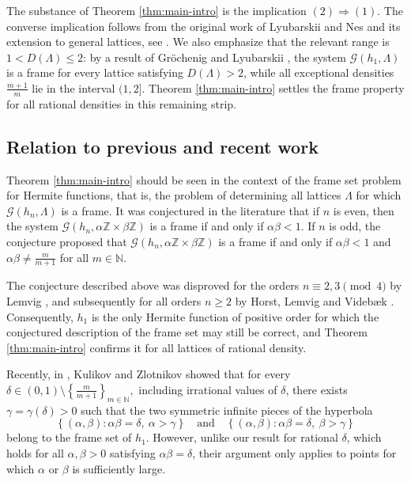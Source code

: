 \documentclass[reqno,a4paper,12pt]{amsart}
\numberwithin{equation}{section}
\newcommand{\N}{\mathbb N}
\newcommand{\Z}{\mathbb Z}
\newcommand{\calG}{\mathcal G}
\begin{document}
The substance of Theorem \ref{thm:main-intro} is the implication $(2)\Rightarrow(1)$. The converse implication follows from the original work of Lyubarskii and Nes and its extension to general lattices, see \cite{Faulhuber2020}.
We also emphasize that the relevant range is $1 < D(\Lambda) \leq 2$: by a result of Gr\"ochenig and Lyubarskii \cite{GroechenigLyubarskii2007,GroechenigLyubarskii2009}, the system $\calG(h_1,\Lambda)$ is a frame for every lattice satisfying $D(\Lambda) > 2$, while all exceptional densities $\frac{m+1}{m}$ lie in the interval $(1,2]$. Theorem \ref{thm:main-intro} settles the frame property for all rational densities in this remaining strip.

\subsection{Relation to previous and recent work}\label{sec:prev_rec_work}
Theorem \ref{thm:main-intro} should be seen in the context of the frame set problem for Hermite functions, that is, the problem of determining all lattices $\Lambda$ for which $\calG(h_n,\Lambda)$ is a frame. It was conjectured in the literature \cite[Conj.~4.2]{Groechenig2014} that if $n$ is even, then the system $\calG(h_n,\alpha\Z \times \beta \Z)$ is a frame if and only if $\alpha\beta < 1$. If $n$ is odd, the conjecture proposed that $\calG(h_n,\alpha\Z \times \beta \Z)$ is a frame if and only if $\alpha\beta < 1$ and $\alpha\beta \neq \frac{m}{m+1}$ for all $m \in \N$.

The conjecture described above was disproved for the orders $n \equiv 2,3 \pmod 4$ by Lemvig \cite{Lemvig2017}, and subsequently for all orders $n \geq 2$ by Horst, Lemvig and Videb\ae k \cite{HorstEtAl2025}. Consequently, $h_1$ is the only Hermite function of positive order for which the conjectured description of the frame set may still be correct, and Theorem \ref{thm:main-intro} confirms it for all lattices of rational density. 

Recently, in \cite{AKIZ}, Kulikov and Zlotnikov showed that for every
$
\delta\in(0,1)\setminus\left\{\frac{m}{m+1}\right\}_{m\in\mathbb N},
$
including irrational values of $\delta$, there exists $\gamma=\gamma(\delta)>0$ such that the two symmetric infinite pieces of the hyperbola
$$
\left \{(\alpha,\beta):\alpha\beta=\delta,\ \alpha>\gamma \right \}
\quad\text{and}\quad
\left \{(\alpha,\beta):\alpha\beta=\delta,\ \beta>\gamma \right \}
$$
belong to the frame set of $h_1$. However, unlike our result for rational $\delta$, which holds for all $\alpha,\beta>0$ satisfying $\alpha\beta=\delta$, their argument only applies to points for which $\alpha$ or $\beta$ is sufficiently large.
\end{document}
